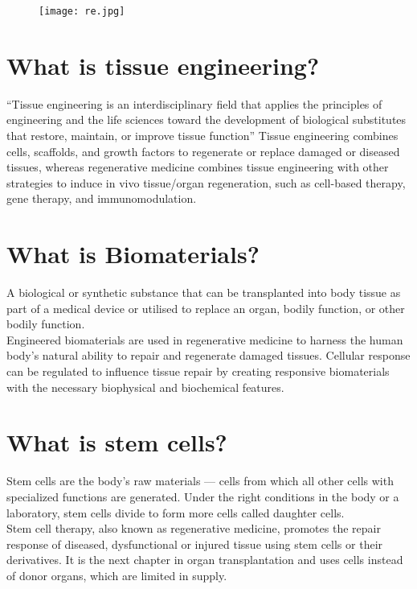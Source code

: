 \documentclass[12pt]{article}
\begin{document}
\begin{figure}[h]
\centering
\texttt{[image: re.jpg]}
\end{figure}
\newpage
\raggedright
\section*{\LARGE  What is tissue engineering? }
\Large
\raggedright
“Tissue engineering is an interdisciplinary field that applies the principles of engineering and the life sciences toward the development of biological substitutes that restore, maintain, or improve tissue function”
\vspace{3mm}
Tissue engineering combines cells, scaffolds, and growth factors to regenerate or replace damaged or diseased tissues, whereas regenerative medicine combines tissue engineering with other strategies to induce in vivo tissue/organ regeneration, such as cell-based therapy, gene therapy, and immunomodulation.

\section*{\LARGE  What is Biomaterials? }
\Large
\raggedright
A biological or synthetic substance that can be transplanted into body tissue as part of a medical device or utilised to replace an organ, bodily function, or other bodily function.\\
\vspace{3mm}
Engineered biomaterials are used in regenerative medicine to harness the human body's natural ability to repair and regenerate damaged tissues. Cellular response can be regulated to influence tissue repair by creating responsive biomaterials with the necessary biophysical and biochemical features.

\section*{\LARGE  What is  stem cells? }
\Large
\raggedright
Stem cells are the body's raw materials — cells from which all other cells with specialized functions are generated. Under the right conditions in the body or a laboratory, stem cells divide to form more cells called daughter cells.\\
\vspace{3mm}
Stem cell therapy, also known as regenerative medicine, promotes the repair response of diseased, dysfunctional or injured tissue using stem cells or their derivatives. It is the next chapter in organ transplantation and uses cells instead of donor organs, which are limited in supply.
\end{document}
